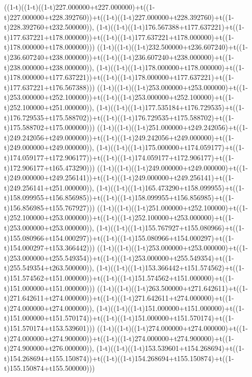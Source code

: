 ((1-t)((1-t)((1-t)227.000000+t227.000000)+t((1-t)227.000000+t228.392760))+t((1-t)((1-t)227.000000+t228.392760)+t((1-t)228.392760+t232.500000)),                                     (1-t)((1-t)((1-t)176.567388+t177.637221)+t((1-t)177.637221+t178.000000))+t((1-t)((1-t)177.637221+t178.000000)+t((1-t)178.000000+t178.000000)))
((1-t)((1-t)((1-t)232.500000+t236.607240)+t((1-t)236.607240+t238.000000))+t((1-t)((1-t)236.607240+t238.000000)+t((1-t)238.000000+t238.000000)),                                     (1-t)((1-t)((1-t)178.000000+t178.000000)+t((1-t)178.000000+t177.637221))+t((1-t)((1-t)178.000000+t177.637221)+t((1-t)177.637221+t176.567388)))
((1-t)((1-t)((1-t)253.000000+t253.000000)+t((1-t)253.000000+t252.100000))+t((1-t)((1-t)253.000000+t252.100000)+t((1-t)252.100000+t251.000000)),                                     (1-t)((1-t)((1-t)177.535184+t176.729535)+t((1-t)176.729535+t175.588702))+t((1-t)((1-t)176.729535+t175.588702)+t((1-t)175.588702+t175.000000)))
((1-t)((1-t)((1-t)251.000000+t249.242056)+t((1-t)249.242056+t249.000000))+t((1-t)((1-t)249.242056+t249.000000)+t((1-t)249.000000+t249.000000)),                                     (1-t)((1-t)((1-t)175.000000+t174.059177)+t((1-t)174.059177+t172.906177))+t((1-t)((1-t)174.059177+t172.906177)+t((1-t)172.906177+t165.473290)))
((1-t)((1-t)((1-t)249.000000+t249.000000)+t((1-t)249.000000+t249.256141))+t((1-t)((1-t)249.000000+t249.256141)+t((1-t)249.256141+t251.000000)),                                     (1-t)((1-t)((1-t)165.473290+t158.099955)+t((1-t)158.099955+t156.856985))+t((1-t)((1-t)158.099955+t156.856985)+t((1-t)156.856985+t155.767927)))
((1-t)((1-t)((1-t)251.000000+t252.100000)+t((1-t)252.100000+t253.000000))+t((1-t)((1-t)252.100000+t253.000000)+t((1-t)253.000000+t253.000000)),                                     (1-t)((1-t)((1-t)155.767927+t155.080966)+t((1-t)155.080966+t154.000297))+t((1-t)((1-t)155.080966+t154.000297)+t((1-t)154.000297+t153.366442)))
((1-t)((1-t)((1-t)253.000000+t253.000000)+t((1-t)253.000000+t255.549354))+t((1-t)((1-t)253.000000+t255.549354)+t((1-t)255.549354+t263.500000)),                                     (1-t)((1-t)((1-t)153.366442+t151.574562)+t((1-t)151.574562+t151.000000))+t((1-t)((1-t)151.574562+t151.000000)+t((1-t)151.000000+t151.000000)))
((1-t)((1-t)((1-t)263.500000+t271.642611)+t((1-t)271.642611+t274.000000))+t((1-t)((1-t)271.642611+t274.000000)+t((1-t)274.000000+t274.000000)),                                     (1-t)((1-t)((1-t)151.000000+t151.000000)+t((1-t)151.000000+t151.570174))+t((1-t)((1-t)151.000000+t151.570174)+t((1-t)151.570174+t153.539601)))
((1-t)((1-t)((1-t)274.000000+t274.000000)+t((1-t)274.000000+t274.900000))+t((1-t)((1-t)274.000000+t274.900000)+t((1-t)274.900000+t276.000000)),                                     (1-t)((1-t)((1-t)153.539601+t154.268694)+t((1-t)154.268694+t155.150874))+t((1-t)((1-t)154.268694+t155.150874)+t((1-t)155.150874+t155.500000)))
